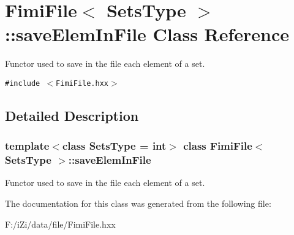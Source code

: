 \section{Fimi\-File$<$ Sets\-Type $>$::save\-Elem\-In\-File Class Reference}
\label{class_fimi_file_1_1save_elem_in_file}
Functor used to save in the file each element of a set.  


{\tt \#include $<$Fimi\-File.hxx$>$}



\subsection{Detailed Description}
\subsubsection*{template$<$class Sets\-Type = int$>$ class Fimi\-File$<$ Sets\-Type $>$::save\-Elem\-In\-File}

Functor used to save in the file each element of a set. 



The documentation for this class was generated from the following file:\begin{CompactItemize}
\item 
F:/i\-Zi/data/file/Fimi\-File.hxx\end{CompactItemize}

